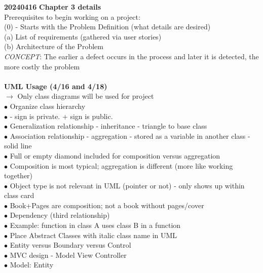 \documentclass[11pt]{article}
\begin{document}
    \textbf{20240416}
    \textbf{Chapter 3 details}\\
    Prerequisites to begin working on a project:\\
    (0) - Starts with the Problem Definition (what details are desired)\\
    (a) List of requirements (gathered via user stories)\\
    (b) Architecture of the Problem\\
    

    \textit{CONCEPT}: The earlier a defect occurs in the process and later 
    it is detected, the more costly the problem\\
    \\
    \textbf{UML Usage (4/16 and 4/18)}\\
    $\rightarrow$ Only class diagrams will be used for project\\
    \indent $\bullet$ Organize class hierarchy\\
    \indent $\bullet$ - sign is private. + sign is public.  \\
    \indent $\bullet$ Generalization relationship - inheritance - triangle to base class  \\
    \indent $\bullet$ Association relationship - aggregation - stored as a variable in another class - solid line  \\
    \indent\indent$\bullet$ Full or empty diamond included for composition versus aggregation \\
    \indent\indent$\bullet$ Composition is most typical; aggregation is different (more like working together)\\
    \indent $\bullet$ Object type is not relevant in UML (pointer or not) - only shows up within class card  \\
    \indent $\bullet$ Book+Pages are composition; not a book without pages/cover \\
    \indent $\bullet$ Dependency (third relationship) \\
    \indent\indent $\bullet$ Example: function in class A uses class B in a function \\
    \indent $\bullet$ Place Abstract Classes with italic class name in UML \\
    \indent $\bullet$ Entity versus Boundary versus Control \\
    \indent\indent $\bullet$ MVC design - Model View Controller \\
    \indent\indent $\bullet$ Model: Entity\\
\end{document}

